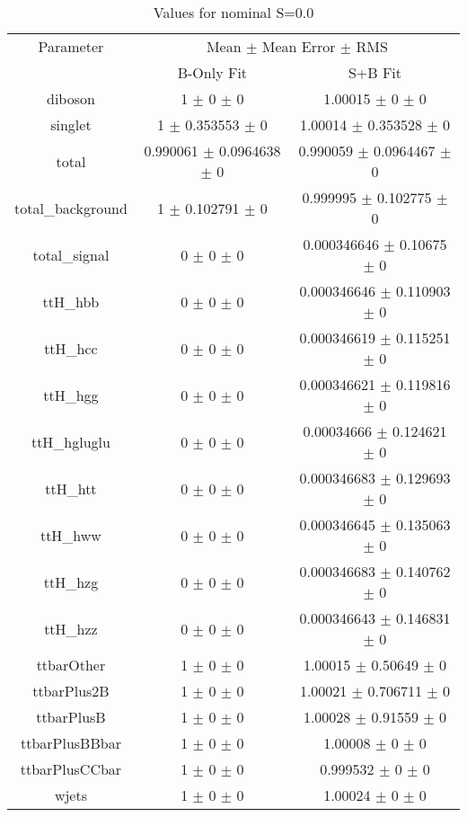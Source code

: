 \begin{table}
\centering
\caption{Values for nominal S=0.0}
\begin{tabular}{ccc}
\toprule
Parameter & \multicolumn{2}{c}{Mean $\pm$ Mean Error $\pm$ RMS}\\
 & B-Only Fit & S+B Fit\\
\midrule
diboson & \num{1} $\pm$ \num{0} $\pm$ \num{0} & \num{1.00015} $\pm$ \num{0} $\pm$ \num{0}\\
singlet & \num{1} $\pm$ \num{0.353553} $\pm$ \num{0} & \num{1.00014} $\pm$ \num{0.353528} $\pm$ \num{0}\\
total & \num{0.990061} $\pm$ \num{0.0964638} $\pm$ \num{0} & \num{0.990059} $\pm$ \num{0.0964467} $\pm$ \num{0}\\
total\_background & \num{1} $\pm$ \num{0.102791} $\pm$ \num{0} & \num{0.999995} $\pm$ \num{0.102775} $\pm$ \num{0}\\
total\_signal & \num{0} $\pm$ \num{0} $\pm$ \num{0} & \num{0.000346646} $\pm$ \num{0.10675} $\pm$ \num{0}\\
ttH\_hbb & \num{0} $\pm$ \num{0} $\pm$ \num{0} & \num{0.000346646} $\pm$ \num{0.110903} $\pm$ \num{0}\\
ttH\_hcc & \num{0} $\pm$ \num{0} $\pm$ \num{0} & \num{0.000346619} $\pm$ \num{0.115251} $\pm$ \num{0}\\
ttH\_hgg & \num{0} $\pm$ \num{0} $\pm$ \num{0} & \num{0.000346621} $\pm$ \num{0.119816} $\pm$ \num{0}\\
ttH\_hgluglu & \num{0} $\pm$ \num{0} $\pm$ \num{0} & \num{0.00034666} $\pm$ \num{0.124621} $\pm$ \num{0}\\
ttH\_htt & \num{0} $\pm$ \num{0} $\pm$ \num{0} & \num{0.000346683} $\pm$ \num{0.129693} $\pm$ \num{0}\\
ttH\_hww & \num{0} $\pm$ \num{0} $\pm$ \num{0} & \num{0.000346645} $\pm$ \num{0.135063} $\pm$ \num{0}\\
ttH\_hzg & \num{0} $\pm$ \num{0} $\pm$ \num{0} & \num{0.000346683} $\pm$ \num{0.140762} $\pm$ \num{0}\\
ttH\_hzz & \num{0} $\pm$ \num{0} $\pm$ \num{0} & \num{0.000346643} $\pm$ \num{0.146831} $\pm$ \num{0}\\
ttbarOther & \num{1} $\pm$ \num{0} $\pm$ \num{0} & \num{1.00015} $\pm$ \num{0.50649} $\pm$ \num{0}\\
ttbarPlus2B & \num{1} $\pm$ \num{0} $\pm$ \num{0} & \num{1.00021} $\pm$ \num{0.706711} $\pm$ \num{0}\\
ttbarPlusB & \num{1} $\pm$ \num{0} $\pm$ \num{0} & \num{1.00028} $\pm$ \num{0.91559} $\pm$ \num{0}\\
ttbarPlusBBbar & \num{1} $\pm$ \num{0} $\pm$ \num{0} & \num{1.00008} $\pm$ \num{0} $\pm$ \num{0}\\
ttbarPlusCCbar & \num{1} $\pm$ \num{0} $\pm$ \num{0} & \num{0.999532} $\pm$ \num{0} $\pm$ \num{0}\\
wjets & \num{1} $\pm$ \num{0} $\pm$ \num{0} & \num{1.00024} $\pm$ \num{0} $\pm$ \num{0}\\
\bottomrule
\end{tabular}
\end{table}